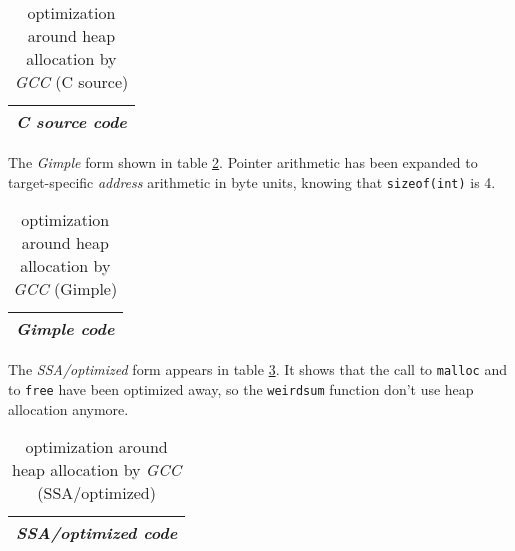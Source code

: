 \begin{table}[t]
\caption{\label{tab:mallfreecsrc} optimization around heap allocation by \emph{GCC} (C source)}
   \medskip
  \begin{center}
    \begin{relsize}{-1.2}
     \begin{tabular}{c}
       \\ 
       \textbf{\emph{C source code}} \\ 
       \hline
     \end{tabular}
    \end{relsize}
  \end{center}
\end{table}




The \emph{Gimple} form shown in table
\ref{tab:mallfreegimple}. Pointer arithmetic has been expanded to
target-specific \emph{address} arithmetic in byte units, knowing that
\texttt{sizeof(int)} is 4.

\begin{table}[t]
\caption{\label{tab:mallfreegimple} optimization around heap allocation by \emph{GCC} (Gimple)}
   \medskip
  \begin{center}
    \begin{relsize}{-1.5}
     \begin{tabular}{c}
       \\ 
       \textbf{\emph{Gimple code}} \\ 
       \hline
     \end{tabular}
    \end{relsize}
  \end{center}
\end{table}

\medskip

The \emph{SSA/optimized} form appears in table
\ref{tab:mallfreeoptim}. It shows that the call to \texttt{malloc} and
to \texttt{free} have been optimized away, so the \texttt{weirdsum}
function don't use heap allocation anymore.

\begin{table}[t]
\caption{\label{tab:mallfreeoptim} optimization around heap allocation by \emph{GCC} (SSA/optimized)}
   \medskip
  \begin{center}
    \begin{relsize}{-1.5}
     \begin{tabular}{c}
       \\ 
       \textbf{\emph{SSA/optimized code}} \\ 
       \hline
     \end{tabular}
    \end{relsize}
  \end{center}
\end{table}

